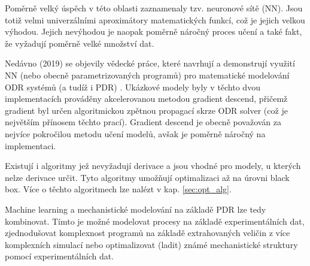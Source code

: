 Poměrně velký úspěch v této oblasti zaznamenaly tzv. neuronové sítě (NN). Jsou
totiž velmi univerzálními aproximátory matematických funkcí, což je jejich
velkou výhodou. Jejich nevýhodou je naopak poměrně náročný proces učení a také
fakt, že vyžadují poměrně velké množství dat.

Nedávno (2019) se objevily vědecké práce, které navrhují a demonstrují využití
NN (nebo obecně parametrizovaných programů) pro matematické modelování ODR
systémů (a tudíž i PDR) \cite{diffEqFlux2019, chen2018neural}. Ukázkové modely
byly v těchto dvou implementacích prováděny akcelerovanou metodou gradient
descend, přičemž gradient byl určen algoritmickou zpětnou propagací skrze ODR
solver (což je největším přínosem těchto prací). Gradient descend je obecně
považován za nejvíce pokročilou metodu učení modelů, avšak je poměrně náročný
na implementaci.

Existují i algoritmy jež nevyžadují derivace a jsou vhodné pro modely, u
kterých nelze derivace určit. Tyto algoritmy umožňují optimalizaci až na úrovni
black box. Více o těchto algoritmech lze nalézt v kap. \ref{sec:opt_alg}.

Machine learning a mechanistické modelování na základě PDR lze tedy kombinovat.
Tímto je možné modelovat procesy na základě experimentálních dat, zjednodušovat
komplexnost programů na základě extrahovaných veličin z více komplexních
simulací nebo optimalizovat (ladit) známé mechanistické struktury pomocí
experimentálních dat.

